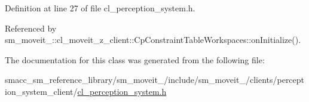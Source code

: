 Definition at line 27 of file cl\+\_\+perception\+\_\+system.\+h.



Referenced by sm\+\_\+moveit\+\_\+::cl\+\_\+moveit\+\_\+z\+\_\+client\+::\+Cp\+Constraint\+Table\+Workspaces\+::on\+Initialize().



The documentation for this class was generated from the following file\+:\begin{DoxyCompactItemize}
\item 
smacc\+\_\+sm\+\_\+reference\+\_\+library/sm\+\_\+moveit\+\_/include/sm\+\_\+moveit\+\_/clients/perception\+\_\+system\+\_\+client/\hyperlink{4_2include_2sm__moveit__4_2clients_2perception__system__client_2cl__perception__system_8h}{cl\+\_\+perception\+\_\+system.\+h}\end{DoxyCompactItemize}
